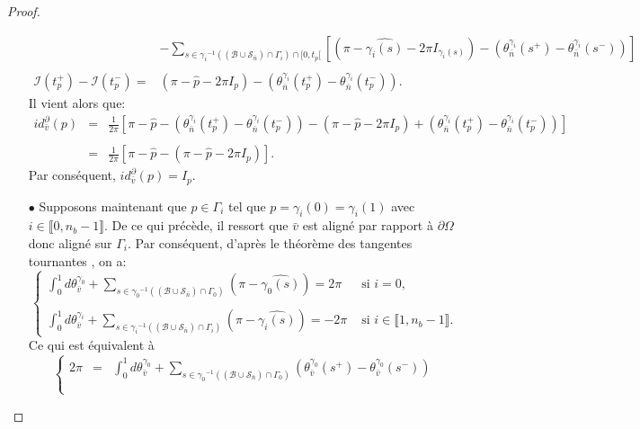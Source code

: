 \begin{proof}
\begin{itemize}
$$\begin{array}{ll}
            &-\displaystyle\sum_{s\in{\gamma_i}^{-1}((\mathcal{B}\cup\mathcal{S}_{\bar{n}})\cap\Gamma_i)\cap[0, t_p[}\left[\left(\pi-\widehat{\gamma_i(s)}-2\pi I_{\gamma_i(s)}\right)-\left(\theta^{\gamma_i}_{\bar{n}}(s^+) - \theta^{\gamma_i}_{\bar{n}}(s^-)\right)\right]\\\\
            \mathcal{I}(t_p^+)-\mathcal{I}(t_p^-)=&\left(\pi-\widehat{p}-2\pi I_p\right)-\left(\theta^{\gamma_i}_{\bar{n}}(t_p^+) - \theta^{\gamma_i}_{\bar{n}}(t_p^-)\right).
        \end{array}
        $$
        Il vient alors que:
        \begin{eqnarray*}
        id^\partial_{\bar{v}}(p)&=&\displaystyle\frac{1}{2\pi}\left[\pi-\widehat{p}-\left(\theta^{\gamma_i}_{\bar{n}}(t_p^+) - \theta^{\gamma_i}_{\bar{n}}(t_p^-)\right)-\left(\pi-\widehat{p}-2\pi I_p\right)+\left(\theta^{\gamma_i}_{\bar{n}}(t_p^+) - \theta^{\gamma_i}_{\bar{n}}(t_p^-)\right)\right]\\\\
        &=&\displaystyle\frac{1}{2\pi}\left[\pi-\widehat{p}-\left(\pi-\widehat{p}-2\pi I_p\right)\right].
        \end{eqnarray*}
        Par conséquent, $id^\partial_{\bar{v}}(p)=I_p$.\\
        \item[$\bullet$] Supposons maintenant que $p\in\Gamma_i$ tel que $p=\gamma_i(0)=\gamma_i(1)$ avec $i\in\llbracket0, n_b-1\rrbracket$. De ce qui précède, il ressort que $\bar{v}$ est aligné par rapport à $\partial\Omega$ donc aligné sur $\Gamma_i$. Par conséquent, d'après le théorème des tangentes tournantes \cite{hopf1935drehung, rotskoff2010gauss}, on a:
        $$
        \left\{
        \begin{array}{ll}
         \displaystyle\int_0^1 d\theta_{\bar{v}}^{\gamma_0}+\sum_{s\in{\gamma_0}^{-1}((\mathcal{B}\cup\mathcal{S}_{\bar{n}})\cap\Gamma_0)}\left(\pi-\widehat{\gamma_0(s)}\right)=2\pi&\mbox{ si }i=0,\\\\
        \displaystyle\int_0^1 d\theta_{\bar{v}}^{\gamma_i}+\sum_{s\in{\gamma_i}^{-1}((\mathcal{B}\cup\mathcal{S}_{\bar{n}})\cap\Gamma_i)}\left(\pi-\widehat{\gamma_i(s)}\right)=-2\pi&\mbox{ si }i\in\llbracket 1, n_b-1\rrbracket.
        \end{array}
        \right.
        $$
        Ce qui est équivalent à
        $$
        \left\{
        \begin{array}{lcl}
         2\pi&=&\displaystyle\int_0^1 d\theta_{\bar{v}}^{\gamma_0}+\displaystyle\sum_{s\in{\gamma_0}^{-1}((\mathcal{B}\cup\mathcal{S}_{\bar{n}})\cap\Gamma_0)}\left(\theta^{\gamma_0}_{\bar{v}}(s^+)-\theta^{\gamma_0}_{\bar{v}}(s^-)\right)\\\\

\end{array}$$
\end{itemize}
\end{proof}
